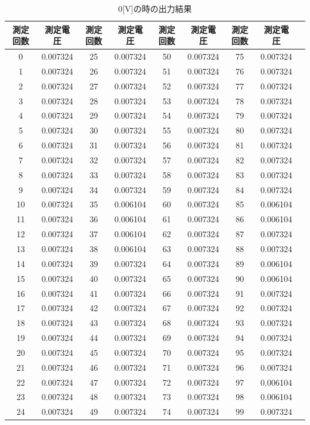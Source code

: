 \documentclass[11pt,dvipdfmx]{jarticle}
\begin{document}
		\begin{table}[b]
			\caption{0[V]の時の出力結果}
			\centering
			\label{tab:0}
			\begin{tabular}{|c|c|c|c|c|c|c|c|c|}
				\hline
			測定回数&測定電圧&測定回数&測定電圧&測定回数&測定電圧&測定回数&測定電圧\\
			\hline
			0  & 0.007324 & 25 & 0.007324 & 50 & 0.007324 & 75 & 0.007324 \\
			1  & 0.007324 & 26 & 0.007324 & 51 & 0.007324 & 76 & 0.007324 \\
			2  & 0.007324 & 27 & 0.007324 & 52 & 0.007324 & 77 & 0.007324 \\
			3  & 0.007324 & 28 & 0.007324 & 53 & 0.007324 & 78 & 0.007324 \\
			4  & 0.007324 & 29 & 0.007324 & 54 & 0.007324 & 79 & 0.007324 \\
			5  & 0.007324 & 30 & 0.007324 & 55 & 0.007324 & 80 & 0.007324 \\
			6  & 0.007324 & 31 & 0.007324 & 56 & 0.007324 & 81 & 0.007324 \\
			7  & 0.007324 & 32 & 0.007324 & 57 & 0.007324 & 82 & 0.007324 \\
			8  & 0.007324 & 33 & 0.007324 & 58 & 0.007324 & 83 & 0.007324 \\
			9  & 0.007324 & 34 & 0.007324 & 59 & 0.007324 & 84 & 0.007324 \\
			10 & 0.007324 & 35 & 0.006104 & 60 & 0.007324 & 85 & 0.006104 \\
			11 & 0.007324 & 36 & 0.006104 & 61 & 0.007324 & 86 & 0.006104 \\
			12 & 0.007324 & 37 & 0.006104 & 62 & 0.007324 & 87 & 0.007324 \\
			13 & 0.007324 & 38 & 0.006104 & 63 & 0.007324 & 88 & 0.007324 \\
			14 & 0.007324 & 39 & 0.007324 & 64 & 0.007324 & 89 & 0.006104 \\
			15 & 0.007324 & 40 & 0.007324 & 65 & 0.007324 & 90 & 0.006104 \\
			16 & 0.007324 & 41 & 0.007324 & 66 & 0.007324 & 91 & 0.007324 \\
			17 & 0.007324 & 42 & 0.007324 & 67 & 0.007324 & 92 & 0.007324 \\
			18 & 0.007324 & 43 & 0.007324 & 68 & 0.007324 & 93 & 0.007324 \\
			19 & 0.007324 & 44 & 0.007324 & 69 & 0.007324 & 94 & 0.007324 \\
			20 & 0.007324 & 45 & 0.007324 & 70 & 0.007324 & 95 & 0.007324 \\
			21 & 0.007324 & 46 & 0.007324 & 71 & 0.007324 & 96 & 0.007324 \\
			22 & 0.007324 & 47 & 0.007324 & 72 & 0.007324 & 97 & 0.006104 \\
			23 & 0.007324 & 48 & 0.007324 & 73 & 0.007324 & 98 & 0.006104 \\
			24 & 0.007324 & 49 & 0.007324 & 74 & 0.007324 & 99 & 0.007324\\
			\hline
			\end{tabular}
			\end{table}
\end{document}
